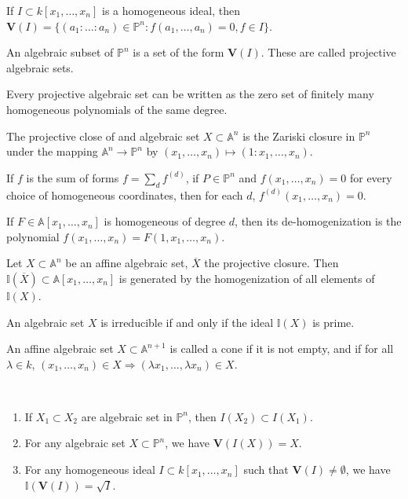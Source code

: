 \documentclass[crop=false,class=book]{standalone}
\begin{document}
\begin{definition}
If $I\subset k[x_1,\hdots ,x_n]$ is a homogeneous ideal, then $\mathbf{V}(I)=\{(a_1:\hdots:a_{n})\in\mathbb{P}^{n}:f(a_{1},\hdots,a_{n})=0,f\in I\}$.
\end{definition}
\begin{definition}
An algebraic subset of $\mathbb{P}^{n}$ is a set of the form $\mathbf{V}(I)$. These are called projective algebraic sets.
\end{definition}
\begin{theorem}
Every projective algebraic set can be written as the zero set of finitely many homogeneous polynomials of the same degree.
\end{theorem}
\begin{definition}
The projective close of and algebraic set $X\subset \mathbb{A}^n$ is the Zariski closure in $\mathbb{P}^n$ under the mapping $\mathbb{A}^n \rightarrow \mathbb{P}^n$ by $(x_1,\hdots, x_n) \mapsto (1:x_1,\hdots, x_n)$.
\end{definition}
\begin{theorem}
If $f$ is the sum of forms $f = \sum_{d} f^{(d)}$, if $P\in \mathbb{P}^n$ and $f(x_1,\hdots, x_n) = 0$ for every choice of homogeneous coordinates, then for each $d$, $f^{(d)}(x_1,\hdots, x_n) = 0$.
\end{theorem}
\begin{definition}
If $F\in \mathbb{A}[x_1,\hdots, x_n]$ is homogeneous of degree $d$, then its de-homogenization is the polynomial $f(x_1,\hdots, x_n) = F(1,x_1,\hdots, x_n)$.
\end{definition}
\begin{theorem}
Let $X\subset \mathbb{A}^n$ be an affine algebraic set, $\overline{X}$ the projective closure. Then $\mathbb{I}(\overline{X})\subset \mathbb{A}[x_1,\hdots, x_n]$ is generated by the homogenization of all elements of $\mathbb{I}(X)$.
\end{theorem}
\begin{theorem}
An algebraic set $X$ is irreducible if and only if the ideal $\mathbb{I}(X)$ is prime.
\end{theorem}
\begin{definition}
An affine algebraic set $X\subset \mathbb{A}^{n+1}$ is called a cone if it is not empty, and if for all $\lambda \in k$, $(x_1,\hdots, x_n) \in X \Rightarrow (\lambda x_1,\hdots, \lambda x_n)\in X$.
\end{definition}
\begin{theorem}
\
\begin{enumerate}
    \item If $X_1\subset X_2$ are algebraic set in $\mathbb{P}^n$, then $I(X_2)\subset I(X_1)$.
    \item For any algebraic set $X\subset \mathbb{P}^n$, we have $\mathbf{V}(I(X)) = X$.
    \item For any homogeneous ideal $I\subset k[x_1,\hdots ,x_n]$ such that $\mathbf{V}(I)\ne \emptyset$, we have $\mathbb{I}(\mathbf{V}(I)) = \sqrt{I}$.
\end{enumerate}
\end{theorem}
\end{document}

